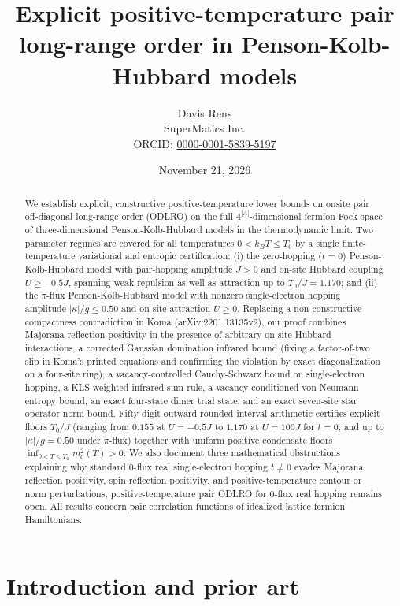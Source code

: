 \documentclass[11pt]{article}
\title{Explicit positive-temperature pair long-range order in Penson-Kolb-Hubbard models}
\author{Davis Rens\\
SuperMatics Inc.\\
ORCID: \href{https://orcid.org/0000-0001-5839-5197}{0000-0001-5839-5197}}
\date{November 21, 2026}
\theoremstyle{definition}
\theoremstyle{remark}
\begin{document}
\maketitle

\begin{abstract}
We establish explicit, constructive positive-temperature lower bounds on onsite pair off-diagonal long-range order (ODLRO) on the full $4^{|\Lambda|}$-dimensional fermion Fock space of three-dimensional Penson-Kolb-Hubbard models in the thermodynamic limit. Two parameter regimes are covered for all temperatures $0 < k_B T \le T_0$ by a single finite-temperature variational and entropic certification: (i) the zero-hopping ($t=0$) Penson-Kolb-Hubbard model with pair-hopping amplitude $J > 0$ and on-site Hubbard coupling $U \ge -0.5J$, spanning weak repulsion as well as attraction up to $T_0/J = 1.170$; and (ii) the $\pi$-flux Penson-Kolb-Hubbard model with nonzero single-electron hopping amplitude $|\kappa|/g \le 0.50$ and on-site attraction $U \ge 0$. Replacing a non-constructive compactness contradiction in Koma (arXiv:2201.13135v2), our proof combines Majorana reflection positivity in the presence of arbitrary on-site Hubbard interactions, a corrected Gaussian domination infrared bound (fixing a factor-of-two slip in Koma's printed equations and confirming the violation by exact diagonalization on a four-site ring), a vacancy-controlled Cauchy-Schwarz bound on single-electron hopping, a KLS-weighted infrared sum rule, a vacancy-conditioned von Neumann entropy bound, an exact four-state dimer trial state, and an exact seven-site star operator norm bound. Fifty-digit outward-rounded interval arithmetic certifies explicit floors $T_0/J$ (ranging from $0.155$ at $U=-0.5J$ to $1.170$ at $U=100J$ for $t=0$, and up to $|\kappa|/g = 0.50$ under $\pi$-flux) together with uniform positive condensate floors $\inf_{0 < T \le T_0} m_0^2(T) > 0$. We also document three mathematical obstructions explaining why standard $0$-flux real single-electron hopping $t \ne 0$ evades Majorana reflection positivity, spin reflection positivity, and positive-temperature contour or norm perturbations; positive-temperature pair ODLRO for $0$-flux real hopping remains open. All results concern pair correlation functions of idealized lattice fermion Hamiltonians.
\end{abstract}

\section{Introduction and prior art}\label{sec:intro}
\end{document}

